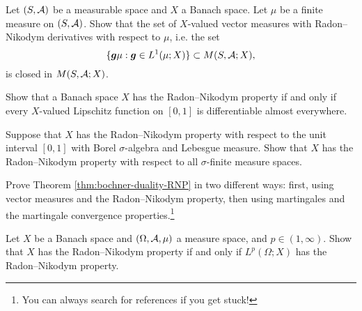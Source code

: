 \begin{exercise}\label{ex:closure-M}
  Let $(S,\mathcal{A})$ be a measurable space and $X$ a Banach space.
  Let $\mu$ be a finite measure on $(S,\mathcal{A})$.
  Show that the set of $X$-valued vector measures with Radon--Nikodym derivatives with respect to $\mu$, i.e. the set
  \begin{equation*}
    \{\bm{g}\mu : \bm{g} \in L^1(\mu;X)\} \subset M(S,\mathcal{A};X),
  \end{equation*}
  is closed in $M(S,\mathcal{A};X)$.
\end{exercise}

\begin{exercise}
  Show that a Banach space $X$ has the Radon--Nikodym property if and only if every $X$-valued Lipschitz function on $[0,1]$ is differentiable almost everywhere.
\end{exercise}

\begin{exercise}\label{ex:RNP-unitinterval}
  Suppose that $X$ has the Radon--Nikodym property with respect to the unit interval $[0,1]$ with Borel $\sigma$-algebra and Lebesgue measure.
  Show that $X$ has the Radon--Nikodym property with respect to all $\sigma$-finite measure spaces.
\end{exercise}

\begin{exercise}\label{ex:RNP-bochner}
  Prove Theorem \ref{thm:bochner-duality-RNP} in two different ways: first, using vector measures and the Radon--Nikodym property, then using martingales and the martingale convergence properties.\footnote{You can always search for references if you get stuck!}
\end{exercise}

\begin{exercise}\label{ex:Lp-RNP}
  Let $X$ be a Banach space and $(\Omega,\mathcal{A},\mu)$ a measure space, and $p \in (1,\infty)$.
  Show that $X$ has the Radon--Nikodym property if and only if $L^p(\Omega;X)$ has the Radon--Nikodym property.
\end{exercise}



